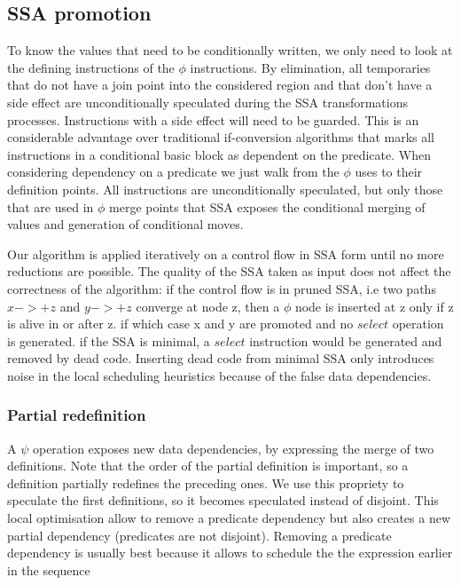 \subsection{SSA promotion}

To know the values that need to be conditionally written, we only need to look at the defining instructions of the $\phi$ instructions. By elimination, all temporaries that do not have a join point into the considered region and that don't have a side effect are unconditionally speculated during the SSA transformations processes. Instructions with a side effect will need to be guarded. This is an considerable advantage over traditional if-conversion algorithms that marks all instructions in a conditional basic block as dependent on the predicate. When considering dependency on a predicate we just walk from the $\phi$ uses to their definition points. All instructions are unconditionally speculated, but only those that are used in $\phi$ merge points that SSA exposes the conditional merging of values and generation of conditional moves.

Our algorithm is applied iteratively on a control flow in SSA form until no more reductions are possible. The quality of the SSA taken as input does not affect the correctness of the algorithm: if the control flow is in pruned SSA, i.e two paths $x->+z$ and $y->+z$ converge at node z, then a $\phi$ node is inserted at z only if z is alive in or after z. if which case x and y are promoted and no $select$ operation is generated. if the SSA is minimal, a $select$ instruction would be generated and removed by dead code. Inserting dead code from minimal SSA only introduces noise in the local scheduling heuristics because of the false data dependencies.

\subsubsection{Partial redefinition}

A $\psi$ operation exposes new data dependencies, by expressing the merge of two definitions. Note that the order of the partial definition is important, so a definition partially redefines the preceding ones. We use this propriety to speculate the first definitions, so it becomes speculated instead of disjoint. This local optimisation allow to remove a predicate dependency but also creates a new partial dependency (predicates are not disjoint). Removing a predicate dependency is usually best because it allows to schedule the the expression earlier in the sequence

